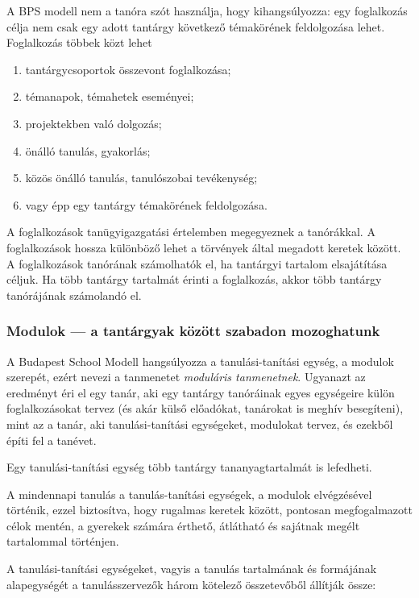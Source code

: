 A BPS modell nem a tanóra szót használja, hogy kihangsúlyozza: egy
foglalkozás célja nem csak egy adott tantárgy következő témakörének
feldolgozása lehet. Foglalkozás többek közt lehet

\begin{enumerate}
\def\labelenumi{\arabic{enumi}.}
\tightlist
\item
  tantárgycsoportok összevont foglalkozása;
\item
  témanapok, témahetek eseményei;
\item
  projektekben való dolgozás;
\item
  önálló tanulás, gyakorlás;
\item
  közös önálló tanulás, tanulószobai tevékenység;
\item
  vagy épp egy tantárgy témakörének feldolgozása.
\end{enumerate}

A foglalkozások tanügyigazgatási értelemben megegyeznek a tanórákkal. A
foglalkozások hossza különböző lehet a törvények által megadott keretek
között. A foglalkozások tanórának számolhatók el, ha tantárgyi tartalom
elsajátítása céljuk. Ha több tantárgy tartalmát érinti a foglalkozás,
akkor több tantárgy tanórájának számolandó el.

\hypertarget{modulok---a-tantargyak-kozott-szabadon-mozoghatunk}{%
\subsubsection{Modulok --- a tantárgyak között szabadon
mozoghatunk}\label{modulok---a-tantargyak-kozott-szabadon-mozoghatunk}}

A Budapest School Modell hangsúlyozza a tanulási-tanítási egység, a
modulok szerepét, ezért nevezi a tanmenetet \emph{moduláris
tanmenetnek}. Ugyanazt az eredményt éri el egy tanár, aki egy tantárgy
tanóráinak egyes egységeire külön foglalkozásokat tervez (és akár
külső előadókat, tanárokat is meghív besegíteni), mint az a tanár, aki
tanulási-tanítási egységeket, modulokat tervez, és ezekből építi fel a
tanévet.

Egy tanulási-tanítási egység több tantárgy tananyagtartalmát is
lefedheti.

A mindennapi tanulás a tanulás-tanítási egységek, a modulok elvégzésével
történik, ezzel biztosítva, hogy rugalmas keretek között, pontosan
megfogalmazott célok mentén, a gyerekek számára érthető, átlátható és
sajátnak megélt tartalommal történjen.

A tanulási-tanítási egységeket, vagyis a tanulás tartalmának és
formájának alapegységét a tanulásszervezők három kötelező összetevőből
állítják össze:

